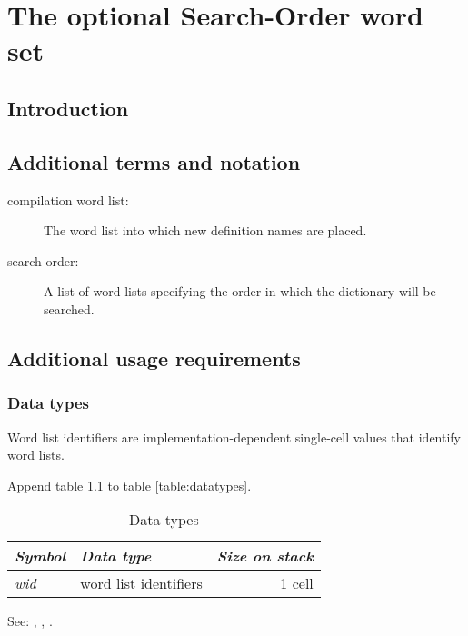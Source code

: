 \chapter{The optional Search-Order word set} %

\section{Introduction} %

\section{Additional terms and notation} %

\begin{description}
\item[compilation word list:]
	The word list into which new definition names are placed.

\item[search order:]
	A list of word lists specifying the order in which the
	dictionary will be searched.
\end{description}

\section{Additional usage requirements} %

\subsection{Data types} %

Word list identifiers are implementation-dependent single-cell
values that identify word lists.

Append table \ref{search:types} to table \ref{table:datatypes}.

\begin{table}[h]
  \begin{center}
	\caption{Data types}
	\label{search:types}
	\begin{tabular}{llr}
	\hline\hline
	\emph{Symbol} & \emph{Data type} & \emph{Size on stack} \\
	\hline
	\emph{wid}		& word list identifiers	& 1 cell \\
	\hline\hline
	\end{tabular}
  \end{center}
\end{table}

See: ,
,
.

